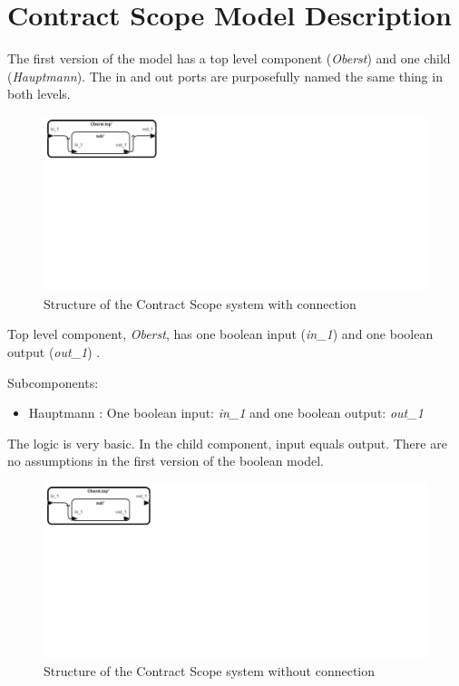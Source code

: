 \documentclass{article}
\begin{document}
\section{Contract Scope Model Description}
The first version of the model has a top level component (\textit{Oberst}) and one child (\textit{Hauptmann}). The in and out ports are purposefully named the same thing in both levels. 

\begin{figure}[h]
\begin{center}
\includegraphics[width=300mm,scale=2.5]{images/good_connection} 
\vspace*{-105mm}
\caption{Structure of the Contract Scope system with connection}
\label{fig:connection}
\end{center}
\end{figure}

Top level component, \textit{Oberst}, has one boolean input (\textit{in\_1}) and one boolean output (\textit{out\_1}) . 

Subcomponents: 
\begin{itemize}
\item Hauptmann : One boolean input: \textit{in\_1} and one boolean output: \textit{out\_1}
\end{itemize}

The logic is very basic. In the child component, input equals output. There are no assumptions in the first version of the boolean model. 

\begin{figure}[h]
\begin{center}
\includegraphics[width=300mm,scale=2.5]{images/broken_connection} 
\vspace*{-105mm}
\caption{Structure of the Contract Scope system without connection}
\label{fig:broken_connection}
\end{center}
\end{figure}
\end{document}
